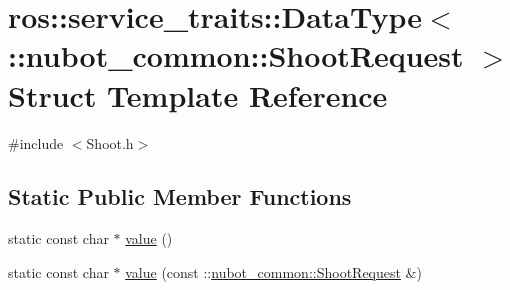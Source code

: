 \hypertarget{structros_1_1service__traits_1_1DataType_3_01_1_1nubot__common_1_1ShootRequest_01_4}{\section{ros\-:\-:service\-\_\-traits\-:\-:Data\-Type$<$ \-:\-:nubot\-\_\-common\-:\-:Shoot\-Request $>$ Struct Template Reference}
\label{structros_1_1service__traits_1_1DataType_3_01_1_1nubot__common_1_1ShootRequest_01_4}
}


{\ttfamily \#include $<$Shoot.\-h$>$}

\subsection*{Static Public Member Functions}
\begin{DoxyCompactItemize}
\item 
static const char $\ast$ \hyperlink{structros_1_1service__traits_1_1DataType_3_01_1_1nubot__common_1_1ShootRequest_01_4_a461c15d21b45417c3dddc4b67c0fae92}{value} ()
\item 
static const char $\ast$ \hyperlink{structros_1_1service__traits_1_1DataType_3_01_1_1nubot__common_1_1ShootRequest_01_4_a27cf0027e506e9006669b86143d019ac}{value} (const \-::\hyperlink{namespacenubot__common_ae80d20ffb44fb7b8c15ae5efb75aed2a}{nubot\-\_\-common\-::\-Shoot\-Request} \&)
\end{DoxyCompactItemize}


